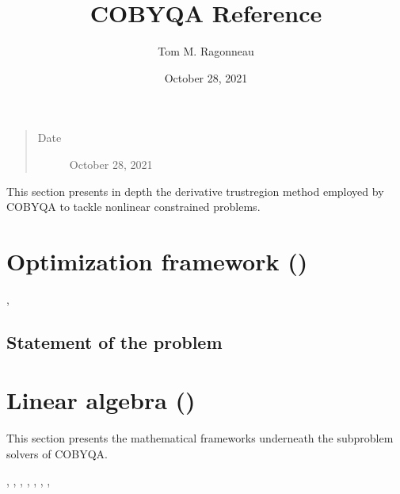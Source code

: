 \documentclass[letterpaper,10pt,english]{sphinxmanual}
\title{COBYQA Reference}
\date{October 28, 2021}
\author{Tom M. Ragonneau}
\begin{document}
\pagestyle{empty}
\sphinxmaketitle
\pagestyle{plain}
\sphinxtableofcontents
\pagestyle{normal}
\label{\detokenize{algo/index::doc}}

\begin{quote}\begin{description}
\item[{Date}] \leavevmode
\sphinxAtStartPar
October 28, 2021

\end{description}\end{quote}

\sphinxAtStartPar
This section presents in depth the derivative trust\sphinxhyphen{}region method employed by
COBYQA to tackle nonlinear constrained problems.


\chapter{Optimization framework ()}
\label{\detokenize{algo/optimize:optimization-framework-cobyqa}}\label{\detokenize{algo/optimize:optimize}}\label{\detokenize{algo/optimize::doc}}

\nopagebreak


\sphinxAtStartPar
{},




\section{Statement of the problem}
\label{\detokenize{algo/optimize:statement-of-the-problem}}\label{\detokenize{algo/optimize:bibliography-1}}

\chapter{Linear algebra ()}
\label{\detokenize{algo/linalg:linear-algebra-cobyqa-linalg}}\label{\detokenize{algo/linalg:linalg}}\label{\detokenize{algo/linalg::doc}}
\sphinxAtStartPar
This section presents the mathematical frameworks underneath the subproblem
solvers of COBYQA.


\nopagebreak


\sphinxAtStartPar
{},
,
,
,
,
,
,
\end{document}
